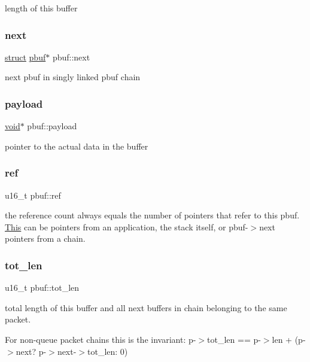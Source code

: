 length of this buffer \mbox{\label{structpbuf_a5e5763c94fd18d78937b0b58ce7df341}} 
\subsubsection{\texorpdfstring{next}{next}}
{\footnotesize\ttfamily \hyperlink{interfacestruct}{struct} \hyperlink{structpbuf}{pbuf}$\ast$ pbuf\+::next}

next pbuf in singly linked pbuf chain \mbox{\label{structpbuf_a8d32dc3e964369d4eec638fc37fbc460}} 
\subsubsection{\texorpdfstring{payload}{payload}}
{\footnotesize\ttfamily \hyperlink{interfacevoid}{void}$\ast$ pbuf\+::payload}

pointer to the actual data in the buffer \mbox{\label{structpbuf_a18e2c02942feb1baa3756fcd585b6731}} 
\subsubsection{\texorpdfstring{ref}{ref}}
{\footnotesize\ttfamily u16\+\_\+t pbuf\+::ref}

the reference count always equals the number of pointers that refer to this pbuf. \hyperlink{namespace_this}{This} can be pointers from an application, the stack itself, or pbuf-\/$>$next pointers from a chain. \mbox{\label{structpbuf_a5259e7ec29bab9c0999b64f2e86b411f}} 
\subsubsection{\texorpdfstring{tot\+\_\+len}{tot\_len}}
{\footnotesize\ttfamily u16\+\_\+t pbuf\+::tot\+\_\+len}

total length of this buffer and all next buffers in chain belonging to the same packet.

For non-\/queue packet chains this is the invariant\+: p-\/$>$tot\+\_\+len == p-\/$>$len + (p-\/$>$next? p-\/$>$next-\/$>$tot\+\_\+len\+: 0) \mbox{\label{structpbuf_afd7bff5210a022424caa97d2f25fe8e6}} 
